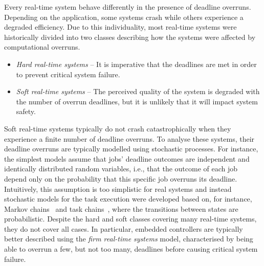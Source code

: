Every real-time system behave differently in the presence of deadline overruns.
Depending on the application, some systems crash while others experience a degraded efficiency.
Due to this individuality, most real-time systems were historically divided into two classes describing how the systems were affected by computational overruns.
%
\begin{itemize}
    \item \emph{Hard real-time systems} -- It is imperative that the deadlines are met in order to prevent critical system failure.

    \item \emph{Soft real-time systems} -- The perceived quality of the system is degraded with the number of overrun deadlines, but it is unlikely that it will impact system safety.
\end{itemize}
%
Soft real-time systems typically do not crash catastrophically when they experience a finite number of deadline overruns.
To analyse these systems, their deadline overruns are typically modelled using stochastic processes.
For instance, the simplest models assume that jobs' deadline outcomes are independent and identically distributed random variables, i.e., that the outcome of each job depend only on the probability that this specific job overruns its deadline.
Intuitively, this assumption is too simplistic for real systems and instead stochastic models for the task execution were developed based on, for instance, Markov chains~\cite{Liu:2005, Friebe:2022, Abeni:2017, Lincoln:2002} and task chains~\cite{Manolache:2004, Liu:2010}, where the transitions between states are probabilistic.
Despite the hard and soft classes covering many real-time systems, they do not cover all cases.
In particular, embedded controllers are typically better described using the \emph{firm real-time systems} model, characterised by being able to overrun a few, but not too many, deadlines before causing critical system failure.

